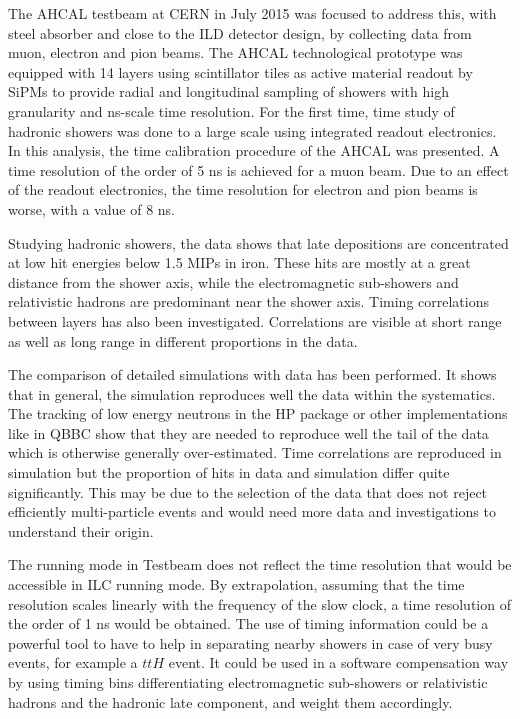 The AHCAL testbeam at CERN in July 2015 was focused to address this, with steel absorber and close to the ILD detector design, by collecting data from muon, electron and pion beams. The AHCAL technological prototype was equipped with 14 layers using scintillator tiles as active material readout by SiPMs to provide radial and longitudinal sampling of showers with high granularity and ns-scale time resolution. For the first time, time study of hadronic showers was done to a large scale using integrated readout electronics.
In this analysis, the time calibration procedure of the AHCAL was presented. A time resolution of the order of 5 ns is achieved for a muon beam. Due to an effect of the readout electronics, the time resolution for electron and pion beams is worse, with a value of 8 ns.

Studying hadronic showers, the data shows that late depositions are concentrated at low hit energies below 1.5 MIPs in iron. These hits are mostly at a great distance from the shower axis, while the electromagnetic sub-showers and relativistic hadrons are predominant near the shower axis. Timing correlations between layers has also been investigated. Correlations are visible at short range as well as long range in different proportions in the data.

The comparison of detailed simulations with data has been performed. It shows that in general, the simulation reproduces well the data within the systematics. The tracking of low energy neutrons in the HP package or other implementations like in QBBC show that they are needed to reproduce well the tail of the data which is otherwise generally over-estimated. Time correlations are reproduced in simulation but the proportion of hits in data and simulation differ quite significantly. This may be due to the selection of the data that does not reject efficiently multi-particle events and would need more data and investigations to understand their origin.

The running mode in Testbeam does not reflect the time resolution that would be accessible in ILC running mode. By extrapolation, assuming that the time resolution scales linearly with the frequency of the slow clock, a time resolution of the order of 1 ns would be obtained. The use of timing information could be a powerful tool to have to help in separating nearby showers in case of very busy events, for example a $ttH$ event. It could be used in a software compensation way by using timing bins differentiating electromagnetic sub-showers or relativistic hadrons and the hadronic late component, and weight them accordingly.
